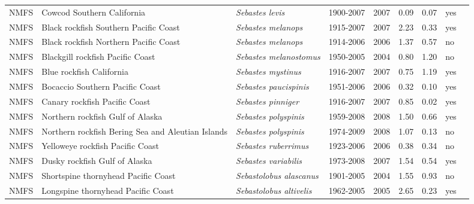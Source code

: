 \begin{longtable}{p{1.8cm}p{4cm}p{4cm}ccccp{1.9cm}c}
  NMFS & Cowcod Southern California & \textit{Sebastes levis} & 1900-2007 & 2007 & 0.09 & 0.07 & yes & \cite{NWFSC-COWCODSCAL-2007-Cowcod CA.pdf} \\ 
  NMFS & Black rockfish Southern Pacific Coast & \textit{Sebastes melanops} & 1915-2007 & 2007 & 2.23 & 0.33 & yes & \cite{NWFSC-BLACKROCKSPCOAST-2007-Black rockfish OR CA.pdf} \\ 
  NMFS & Black rockfish Northern Pacific Coast & \textit{Sebastes melanops} & 1914-2006 & 2006 & 1.37 & 0.57 & no & \cite{NWFSC-BLACKROCKNPCOAST-2007-Black rockfish NOR WA.pdf} \\ 
  NMFS & Blackgill rockfish  Pacific Coast & \textit{Sebastes melanostomus} & 1950-2005 & 2004 & 0.80 & 1.20 & no & \cite{2005-SAFE-Wcblackgill.pdf} \\ 
  NMFS & Blue rockfish California & \textit{Sebastes mystinus} & 1916-2007 & 2007 & 0.75 & 1.19 & yes & \cite{NWFSC-BLUEROCKCAL-2007-Blue rockfish CA.pdf} \\ 
  NMFS & Bocaccio Southern Pacific Coast & \textit{Sebastes paucispinis} & 1951-2006 & 2006 & 0.32 & 0.10 & yes & \cite{NWFSC-BOCACCSPCOAST-2007 Bocaccio.pdf} \\ 
  NMFS & Canary rockfish Pacific Coast & \textit{Sebastes pinniger} & 1916-2007 & 2007 & 0.85 & 0.02 & yes & \cite{NWFSC-CROCKPCOAST-2007-Canary.pdf} \\ 
  NMFS & Northern rockfish Gulf of Alaska & \textit{Sebastes polyspinis} & 1959-2008 & 2008 & 1.50 & 0.66 & yes & \cite{AFSC-NROCKGA-2008-Northern rockfish GA.pdf} \\ 
  NMFS & Northern rockfish Bering Sea and Aleutian Islands & \textit{Sebastes polyspinis} & 1974-2009 & 2008 & 1.07 & 0.13 & no & \cite{2008_SAFE_BSAInorthern.pdf} \\ 
  NMFS & Yelloweye rockfish Pacific Coast & \textit{Sebastes ruberrimus} & 1923-2006 & 2006 & 0.38 & 0.34 & no & \cite{NWFSC-YEYEROCKPCOAST-2007-yelloweye.pdf} \\ 
  NMFS & Dusky rockfish Gulf of Alaska & \textit{Sebastes variabilis} & 1973-2008 & 2007 & 1.54 & 0.54 & yes & \cite{AFSC-DUSROCKGA-2008-Dusky rockfish GA.pdf} \\ 
  NMFS & Shortspine thornyhead Pacific Coast & \textit{Sebastolobus alascanus} & 1901-2005 & 2004 & 1.55 & 0.93 & no & \cite{2005-SST-assessment.pdf} \\ 
  NMFS & Longspine thornyhead Pacific Coast & \textit{Sebastolobus altivelis} & 1962-2005 & 2005 & 2.65 & 0.23 & yes & \cite{2005-SAFE-Longspine.pdf} \\ 

\end{longtable}

